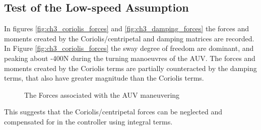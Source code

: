 	\subsection{Test of the Low-speed Assumption}
		In figures \ref{fig:ch3_coriolis_forces} and \ref{fig:ch3_damping_forces} the forces and
		moments created by the Coriolis/centripetal and damping matrices are recorded. In Figure
		\ref{fig:ch3_coriolis_forces} the sway degree of freedom are dominant, and peaking about
		-400N during the turning manoeuvres of the AUV. The forces and moments created by the Coriolis
		terms are partially counteracted by the damping terms, that also have greater magnitude than
		the Coriolis terms.
		\begin{figure}[htbp]
			\centering
			\caption{The Forces associated with the AUV maneuvering}
			\label{fig:ch3-maneuvering forces}
		\end{figure}
		This suggests that the Coriolis/centripetal forces can be neglected and compensated for in the
		controller using integral terms.  

